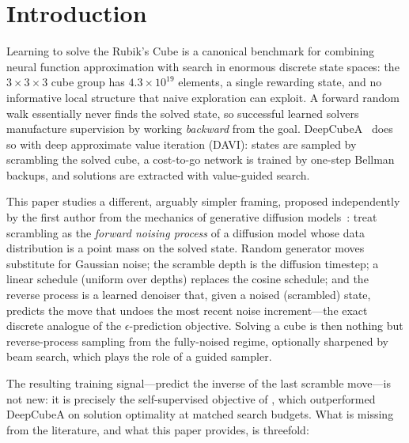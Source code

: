 \documentclass[11pt]{article}
\begin{document}
\section{Introduction}

Learning to solve the Rubik's Cube is a canonical benchmark for combining
neural function approximation with search in enormous discrete state spaces:
the $3{\times}3{\times}3$ cube group has $4.3\times10^{19}$ elements, a single
rewarding state, and no informative local structure that naive exploration can
exploit. A forward random walk essentially never finds the solved state, so
successful learned solvers manufacture supervision by working
\emph{backward} from the goal. DeepCubeA~\citep{agostinelli2019} does so with
deep approximate value iteration (DAVI): states are sampled by scrambling the
solved cube, a cost-to-go network is trained by one-step Bellman backups, and
solutions are extracted with value-guided search.

This paper studies a different, arguably simpler framing, proposed
independently by the first author from the mechanics of generative diffusion
models~\citep{sohldickstein2015,ho2020}: treat scrambling as the
\emph{forward noising process} of a diffusion model whose data distribution is
a point mass on the solved state. Random generator moves substitute for
Gaussian noise; the scramble depth is the diffusion timestep; a linear
schedule (uniform over depths) replaces the cosine schedule; and the reverse
process is a learned denoiser that, given a noised (scrambled) state, predicts
the move that undoes the most recent noise increment---the exact discrete
analogue of the $\epsilon$-prediction objective. Solving a cube is then
nothing but reverse-process sampling from the fully-noised regime, optionally
sharpened by beam search, which plays the role of a guided sampler.

The resulting training signal---predict the inverse of the last scramble
move---is not new: it is precisely the self-supervised objective of
\citet{takano2023}, which outperformed DeepCubeA on solution optimality at
matched search budgets. What is missing from the literature, and what this
paper provides, is threefold:
\end{document}
